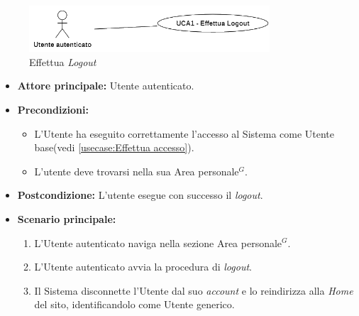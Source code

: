 \newpage
{}
\label{usecase:Effettua Logout}

\begin{figure}[h]
	\centering
	\includegraphics[width=0.8\textwidth]{./uml/UCA1.png} 
	\caption{Effettua \textit{Logout}}
	\label{fig:UCA1}
  \end{figure}

\begin{itemize}
	\item \textbf{Attore principale:} Utente autenticato.

	\item \textbf{Precondizioni:}
	\begin{itemize}
        \item L'Utente ha eseguito correttamente l'accesso al Sistema come Utente base(vedi \autoref{usecase:Effettua accesso}).
        \item L'utente deve trovarsi nella sua Area personale$^G$.
    \end{itemize}

	\item \textbf{Postcondizione:} L'utente esegue con successo il \textit{logout}.

	\item \textbf{Scenario principale:}
	      \begin{enumerate}
		      \item L'Utente autenticato naviga nella sezione Area personale$^G$.
		      \item L'Utente autenticato avvia la procedura di \textit{logout}.
              \item Il Sistema disconnette l'Utente dal suo \textit{account} e lo reindirizza alla \textit{Home} del sito, identificandolo come Utente generico.
	      \end{enumerate}
\end{itemize}
